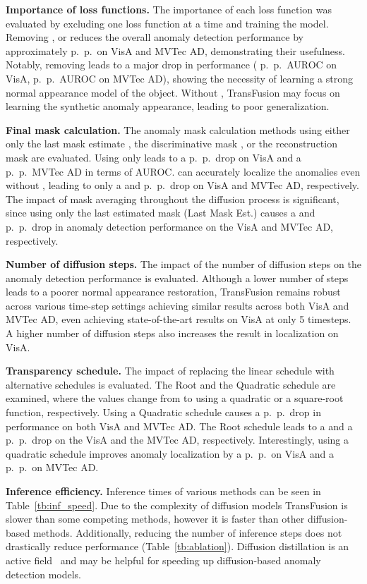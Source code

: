 \documentclass[10pt,twocolumn,letterpaper]{article}
\begin{document}
\noindent\textbf{Importance of loss functions.} The importance of each loss function was evaluated by excluding one loss function at a time and training the model. Removing ,  or  reduces the overall anomaly detection performance by approximately  p.\ p.\ on VisA and MVTec AD, demonstrating their usefulness. Notably, removing   leads to a major drop in performance ( p.\ p.\ AUROC on VisA,  p.\ p.\ AUROC on MVTec AD), showing the necessity of learning a strong normal appearance model of the object. Without , TransFusion may focus on learning the synthetic anomaly appearance, leading to poor generalization. 

\noindent\textbf{Final mask calculation.} The anomaly mask calculation methods using either only the last mask estimate , the discriminative mask , or the reconstruction mask  are evaluated. Using only  leads to a  p.\ p.\ drop on VisA and a  p.\ p.\ MVTec AD in terms of AUROC.  can accurately localize the anomalies even without , leading to only a  and  p.\ p.\ drop on VisA and MVTec AD, respectively. The impact of mask averaging throughout the diffusion process is significant, since using only the last estimated mask (Last Mask Est.) causes a  and  p.\ p.\ drop in anomaly detection performance on the VisA and MVTec AD, respectively.

\noindent\textbf{Number of diffusion steps.} The impact of the number of diffusion steps on the anomaly detection performance is evaluated. Although a lower number of steps leads to a poorer normal appearance restoration, TransFusion remains robust across various time-step settings achieving similar results across both VisA and MVTec AD, even achieving state-of-the-art results on VisA at only 5 timesteps. A higher number of diffusion steps also increases the result in localization on VisA.


\noindent\textbf{Transparency schedule.} The impact of replacing the linear  schedule with alternative schedules is evaluated. The Root and the Quadratic schedule are examined, where the  values change from  to  using a quadratic or a square-root function, respectively. Using a Quadratic schedule causes a  p.\ p.\ drop in performance on both VisA and MVTec AD. The Root schedule leads to a  and a  p.\ p.\ drop on the VisA and the MVTec AD, respectively. Interestingly, using a quadratic schedule improves anomaly localization by a  p.\ p.\ on VisA and a  p.\ p.\ on MVTec AD. 



\noindent\textbf{Inference efficiency.} Inference times of various methods can be seen in Table~\ref{tb:inf_speed}. Due to the complexity of diffusion models TransFusion is slower than some competing methods, however it is faster than other diffusion-based methods. Additionally, reducing the number of inference steps does not drastically reduce performance (Table~\ref{tb:ablation}). Diffusion distillation is an active field~\cite{diff_distillation, progressive_diffusion_distillation, consistency_model} and may be helpful for speeding up diffusion-based anomaly detection models.
\end{document}
